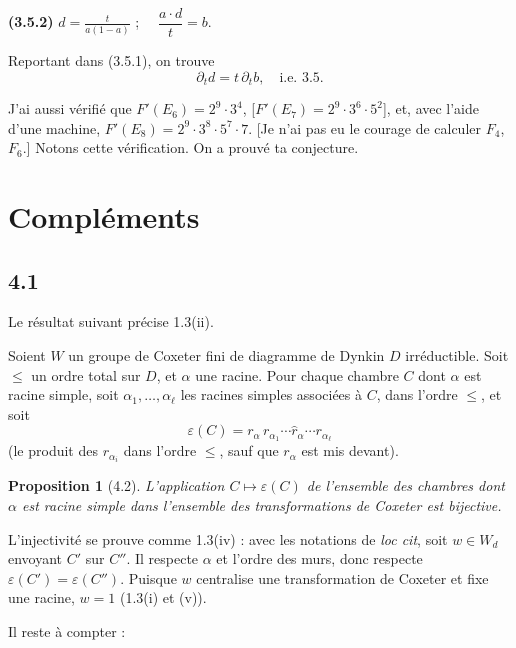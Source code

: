 \documentclass[11pt,a4paper]{article}
\theoremstyle{plain}
\newtheorem{proposition}[theorem]{Proposition}
\theoremstyle{definition}
\begin{document}
\smallskip

\noindent
\textbf{(3.5.2)} $\displaystyle d = \frac{t}{a(1-a)}$ ; $\quad \dfrac{a \cdot d}{t} = b$.

\smallskip

Reportant dans (3.5.1), on trouve
\[
\partial_t d = t\, \partial_t b, \quad \text{i.e.\ 3.5}.
\]

\smallskip

J'ai aussi v\'erifi\'e que $F'(E_6) = 2^9 \cdot 3^4$, [$F'(E_7) = 2^9 \cdot 3^6 \cdot 5^2$], et, avec l'aide d'une machine, $F'(E_8) = 2^9 \cdot 3^8 \cdot 5^7 \cdot 7$. [Je n'ai pas eu le courage de calculer $F_4$, $F_6$.] Notons cette v\'erification. On a prouv\'e ta conjecture.

\newpage

\section{Compl\'ements}

\subsection*{4.1}

Le r\'esultat suivant pr\'ecise 1.3(ii).

Soient $W$ un groupe de Coxeter fini de diagramme de Dynkin $D$ irr\'eductible. Soit $\leq$ un ordre total sur $D$, et $\alpha$ une racine. Pour chaque chambre $C$ dont $\alpha$ est racine simple, soit $\alpha_1, \ldots, \alpha_\ell$ les racines simples associ\'ees \`a $C$, dans l'ordre $\leq$, et soit
\[
\varepsilon(C) = r_\alpha\, r_{\alpha_1} \cdots \widehat{r}_\alpha \cdots r_{\alpha_\ell}
\]
(le produit des $r_{\alpha_i}$ dans l'ordre $\leq$, sauf que $r_\alpha$ est mis devant).

\begin{proposition}[4.2]
L'application $C \mapsto \varepsilon(C)$ de l'ensemble des chambres dont $\alpha$ est racine simple dans l'ensemble des transformations de Coxeter est bijective.
\end{proposition}

L'injectivit\'e se prouve comme 1.3(iv) : avec les notations de \textit{loc cit}, soit $w \in W_d$ envoyant $C'$ sur $C''$. Il respecte $\alpha$ et l'ordre des murs, donc respecte $\varepsilon(C') = \varepsilon(C'')$. Puisque $w$ centralise une transformation de Coxeter et fixe une racine, $w = 1$ (1.3(i) et (v)).

\smallskip

Il reste \`a compter :
\end{document}
